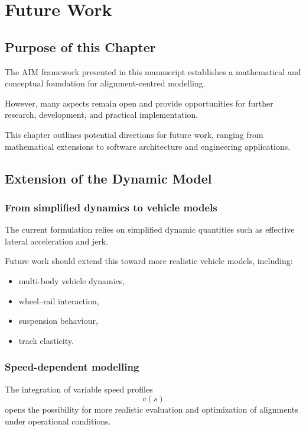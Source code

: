 \chapter{Future Work}

\section{Purpose of this Chapter}

The AIM framework presented in this manuscript establishes a
mathematical and conceptual foundation for alignment-centred modelling.

However, many aspects remain open and provide opportunities for further
research, development, and practical implementation.

This chapter outlines potential directions for future work, ranging from
mathematical extensions to software architecture and engineering
applications.


\section{Extension of the Dynamic Model}

\subsection{From simplified dynamics to vehicle models}

The current formulation relies on simplified dynamic quantities such as
effective lateral acceleration and jerk.

Future work should extend this toward more realistic vehicle models,
including:
\begin{itemize}
\item multi-body vehicle dynamics,
\item wheel--rail interaction,
\item suspension behaviour,
\item track elasticity.
\end{itemize}

\subsection{Speed-dependent modelling}

The integration of variable speed profiles
\[
v(s)
\]
opens the possibility for more realistic evaluation and optimization of
alignments under operational conditions.


